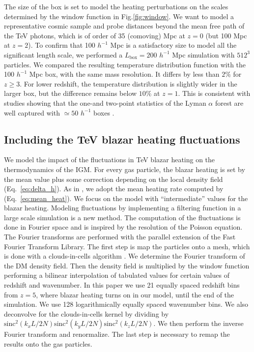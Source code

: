 \documentclass[twocolumns]{emulateapj}
\begin{document}
The size of the box is set to model the heating perturbations on the scales determined by the window function in Fig.\ref{fig:window}. We want to model a representative cosmic sample and probe distances beyond the mean free path of the TeV photons, which is of order of 35 (comoving) Mpc at $z=0$ (but 100 Mpc at $z=2$). To confirm that 100 $h^{-1}$ Mpc is a satisfactory size to model all the significant length scale, we performed a $L_\mathrm{box}=200 $ $h^{-1}$ Mpc simulation with $512^3$ particles. We compared the resulting temperature distribution function with the 100 $h^{-1}$ Mpc box, with the same mass resolution. It differs by less than $2\%$ for $z\geqslant 3$. For lower redshift, the temperature distribution is slightly wider in the larger box, but the difference remains below $10\%$ at $z=1$. This is consistent with studies showing that the one-and two-point statistics of the Lyman $\alpha$ forest are well captured with $\simeq 50$ $h^{-1}$ boxes \citep{2007MNRAS.374..196R,2009MNRAS.398L..26B}.
\subsection{Including the TeV blazar heating fluctuations}
We model the impact of the fluctuations in TeV blazar heating on the thermodynamics of the IGM. For every gas particle, the blazar heating is set by the mean value plus some correction depending on the local density field (Eq.~\eqref{eq:delta_h}). As in \citet{2012MNRAS.423..149P}, we adopt the mean heating rate computed by \citet{2012ApJ...752...23C} (Eq.~\eqref{eq:mean_heat}). We focus on the model with ``intermediate'' values for the blazar heating.
Modeling fluctuations by implementing a filtering function in a large scale simulation is a new method. The computation of the fluctuations is done in Fourier space and is inspired by the resolution of the Poisson equation. The Fourier transforms are performed with the parallel extension of the Fast Fourier Transform Library. The first step is map the particles onto a mesh, which is done with a clouds-in-cells algorithm \citep{1981csup.book.....H}. We determine the Fourier transform of the DM density field. Then the density field is multiplied by the window function performing a bilinear interpolation of tabulated values for certain values of redshift and wavenumber. In this paper we use 21 equally spaced redshift bins from $z=5$, where blazar heating turns on in our model, until the end of the simulation. We use 128 logarithmically equally spaced wavenumber bins. We also deconvolve for the clouds-in-cells kernel by dividing by $\mathrm{sinc}^2(k_x L/2N)\mathrm{sinc}^2(k_y L/2N)\mathrm{sinc}^2(k_z L/2N)$. We then perform the inverse Fourier transform and renormalize. The last step is necessary to remap the results onto the gas particles.
\end{document}
